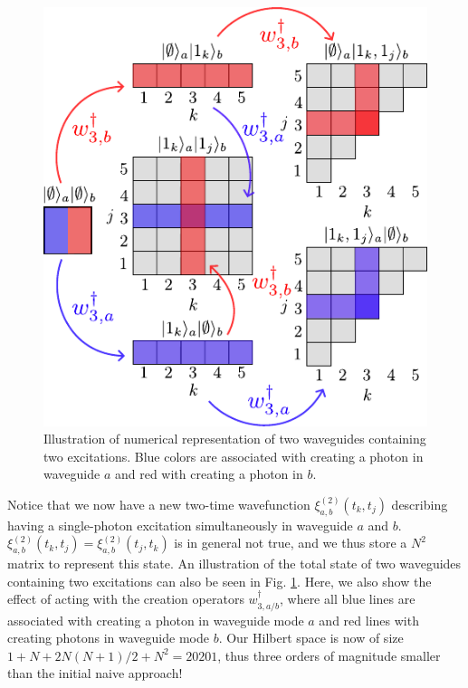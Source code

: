 \begin{figure}
    \centering
    \includegraphics[width = 0.6 \linewidth]{figures/multiplewaveguides_illustration.pdf}
    \caption{Illustration of numerical representation of two waveguides containing two excitations. Blue colors are associated with creating a photon in waveguide $a$ and red with creating a photon in $b$. }
    \label{fig:twowaveguide_illustration}
\end{figure}

Notice that we now have a new two-time wavefunction $\xi^{(2)}_{a,b}(t_k,t_j)$ describing having a single-photon excitation simultaneously in waveguide $a$ and $b$. $\xi^{(2)}_{a,b}(t_k,t_j) = \xi^{(2)}_{a,b}(t_j,t_k)$ is in general not true, and we thus store a $N^2$ matrix to represent this state. An illustration of the total state of two waveguides containing two excitations can also be seen in Fig. \ref{fig:twowaveguide_illustration}. Here, we also show the effect of acting with the creation operators $w^\dagger_{3,a/b}$, where all blue lines are associated with creating a photon in waveguide mode $a$ and red lines with creating photons in waveguide mode $b$. Our Hilbert space is now of size $1+N+2 N(N+1)/2 + N^2 = 20201$, thus three orders of magnitude smaller than the initial naive approach!






